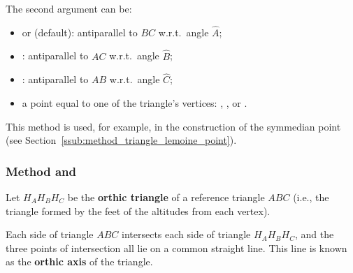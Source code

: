 The second argument  can be:
\begin{itemize}
  \item {} or  (default): antiparallel to $BC$ w.r.t.\ angle $\hat{A}$;
  \item {}: antiparallel to $AC$ w.r.t.\ angle $\hat{B}$;
  \item {}: antiparallel to $AB$ w.r.t.\ angle $\hat{C}$;
  \item a point equal to one of the triangle’s vertices: , , or .
\end{itemize}

\medskip

This method is used, for example, in the construction of the symmedian point (see Section~\ref{ssub:method_triangle_lemoine_point}).

\vspace{1em}
\begin{tkzexample}[latex =.5\textwidth]
\end{tkzexample}


\subsubsection{Method   and }
\label{ssub:method_triangle_orthic_axis}
\label{ssub:method_triangle_orthic_axis_points}

Let $H_AH_BH_C$ be the \textbf{orthic triangle} of a reference triangle $ABC$ (i.e., the triangle formed by the feet of the altitudes from each vertex).

\medskip

Each side of triangle $ABC$ intersects each side of triangle $H_AH_BH_C$, and the three points of intersection all lie on a common straight line. This line is known as the \textbf{orthic axis} of the triangle.

